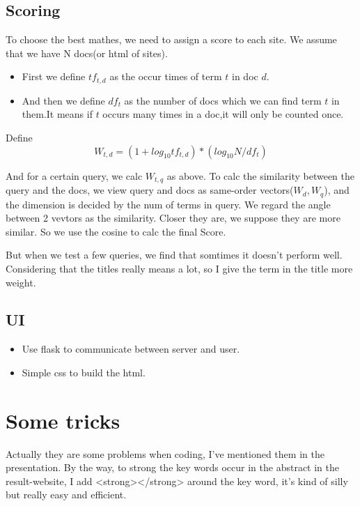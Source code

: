\documentclass[a4paper]{article}
\begin{document}
\subsection {Scoring}
To choose the best mathes, we need to assign a score to each site. We assume that we have N docs(or html of sites).
\begin{itemize}
\item First we define $tf_{t,d}$ as the occur times of term $t$ in doc $d$.
\item And then we define $df_{t}$ as the number of docs which we can find term $t$ in them.It means if $t$ occurs many times in a doc,it will only be counted once.
\end{itemize}
Define 
\[W_{t,d}=(1+log_{10}tf_{t,d})*(log_{10}N/df_{t})\] 
\par
And for a certain query, we calc $W_{t,q}$ as above. To calc the similarity between the query and the docs, we view query and docs as same-order vectors($W_{d}, W_{q}$), and the dimension is decided by the num of terms in query. We regard the angle between 2 vevtors as the similarity. Closer they are, we suppose they are more similar. So we use the cosine to calc the final Score.
\par
But when we test a few queries, we find that somtimes it doesn't perform well. Considering that the titles really means a lot, so I give the term in the title more weight.

\subsection{UI}
\begin{itemize}
\item Use flask to communicate between server and user.
\item Simple css to build the html. 
\end{itemize}

\section {Some tricks}
Actually they are some problems when coding, I've mentioned them in the presentation. By the way, to strong the key words occur in the abstract in the result-website, I add <strong></strong> around the key word, it's kind of silly but really easy and efficient.
\end{document}
